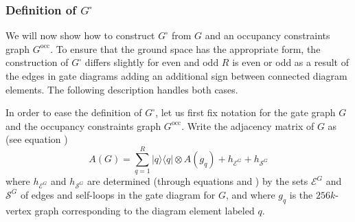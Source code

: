 \documentclass[../thesis-main/thesis-main]{subfiles}
\begin{document}
\subsubsection{Definition of $G^{\square}$\label{sec:g_square_def}}

We will now show how to construct $G^{\square}$ from $G$ and an occupancy constraints graph $G^{\text{occ}}$.  To ensure that the ground space has the appropriate form, the construction of $G^{\square}$ differs slightly for even and odd $R$ is even or odd as a result of the edges in gate diagrams adding an additional sign between connected diagram elements.  The following description handles both cases.

In order to ease the definition of $G^{\square}$, let us first fix notation for the gate graph $G$ and the occupancy constraints graph $G^{\text{occ}}$. Write the adjacency matrix of $G$ as (see equation ) 
\begin{equation}
A(G)=\sum_{q=1}^{R}|q\rangle\langle q|\otimes A(g_{q})+h_{\mathcal{E}^{G}}+h_{\mathcal{S}^{G}}
\end{equation}
where $h_{\mathcal{E}^{G}}$ and $h_{\mathcal{S}^{G}}$ are determined (through equations  and ) by the sets $\mathcal{E}^{G}$ and $\mathcal{S}^{G}$ of edges and self-loops in the gate diagram for $G$, and where $g_q$ is the $256k$-vertex graph corresponding to the diagram element labeled $q$.
\end{document}
